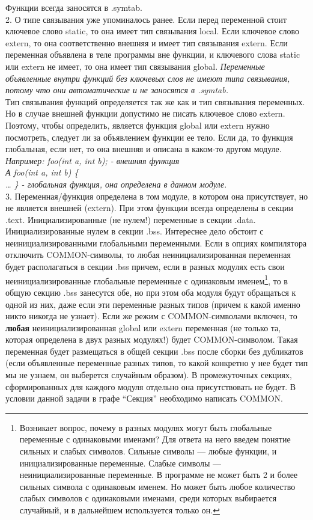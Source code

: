 \documentclass[12pt, letterpaper]{article}
\begin{document}
Функции всегда заносятся в .symtab. \\

2. О типе связывания уже упоминалось ранее. Если перед переменной стоит ключевое слово static, то она имеет тип связывания local. Если ключевое слово extern, то она соответственно внешняя и имеет тип связывания extern. Если переменная объявлена в теле программы вне функции, и ключевого слова static или extern не имеет, то она имеет тип связывания global.\textit{ Переменные объявленные внутри функций без ключевых слов не имеют типа связывания, потому что они автоматические  и не заносятся в .symtab.}\\

Тип связывания функций определяется так же как и тип связывания переменных. Но в случае внешней функции допустимо не писать ключевое слово extern. Поэтому, чтобы определить, является функция global или extern нужно посмотреть, следует ли за объявлением функции ее тело. Если да, то функция глобальная, если нет, то она внешняя и описана в каком-то другом модуле.\\ \textit{Например: \emph{foo(int a, int b);} - внешняя функция}\\
\textit{А \emph{foo(int a, int b) \{\\
\dots
\}} - глобальная функция, она определена в данном модуле}.\\

3. Переменная/функция определена в том модуле, в котором она присутствует, но не является внешней (extern). При этом функции всегда определены в секции .text. Инициализированные (не нулем!) переменные в секции .data. Инициализированные нулем в секции .bss. Интереснее дело обстоит с неинициализированными глобальными переменными. Если в опциях компилятора отключить COMMON-символы, то любая неинициализированная переменная будет располагаться в секции .bss причем, если в разных модулях есть свои неинициализированные глобальные переменные с одинаковым именем\footnote{Возникает вопрос, почему в разных модулях могут быть глобальные переменные с одинаковыми именами? Для ответа на него введем понятие сильных и слабых символов. Сильные символы — любые функции, и инициализированные переменные. Слабые символы — неинициализированные переменные. В программе не может быть 2 и более сильных символа с одинаковым именем. Но может быть любое количество слабых символов с одинаковыми именами, среди которых выбирается случайный, и в дальнейшем используется только он.},
то в общую секцию .bss занесутся обе, но при этом оба модуля будут обращаться к одной из них, даже если эти переменные разных типов (причем к какой именно никто никогда не узнает). Если же режим с COMMON-символами включен, то \textbf{любая} неинициализированная global или extern переменная (не только та, которая определена в двух разных модулях!) будет COMMON-символом. Такая переменная будет размещаться в общей секции .bss после сборки без дубликатов (если объявленные переменные разных типов, то какой конкретно у нее будет тип мы не узнаем, он выберется случайным образом). В промежуточных секциях, сформированных для каждого модуля отдельно она присутствовать не будет. В условии данной задачи в графе ``Секция'' необходимо написать COMMON. \\
\end{document}
